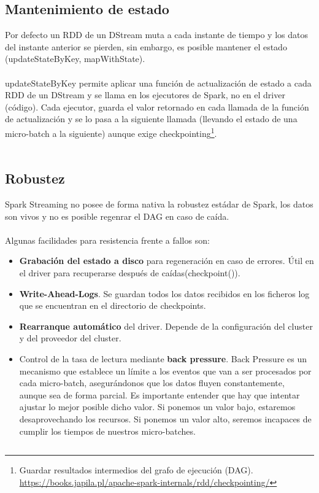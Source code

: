 \subsection{Mantenimiento de estado}
Por defecto un RDD de un DStream muta a cada instante de tiempo y los datos del instante anterior se pierden, sin embargo, es posible mantener el estado (updateStateByKey, mapWithState).\\\\
updateStateByKey permite aplicar una función de actualización de estado a cada RDD de un DStream y se llama en los ejecutores de Spark, no en el driver (código). Cada ejecutor, guarda el valor retornado en cada llamada de la función de actualización y se lo pasa a la siguiente llamada (llevando el estado de una micro-batch a la siguiente) aunque exige checkpointing\footnote{Guardar resultados intermedios del grafo de ejecución (DAG). \url{https://books.japila.pl/apache-spark-internals/rdd/checkpointing/} }.\\\\
\subsection{Robustez}
Spark Streaming no posee de forma nativa la robustez estádar de Spark, los datos son vivos y no es posible regenrar el DAG en caso de caída.\\\\
Algunas facilidades para resistencia frente a fallos son:
\begin{itemize}
	\item \textbf{Grabación del estado a disco} para regeneración en caso de errores. Útil en el driver para recuperarse después de caídas(checkpoint()).
	\item \textbf{Write-Ahead-Logs}. Se guardan todos los datos recibidos en los ficheros log que se encuentran en el directorio de checkpoints.
	\item \textbf{Rearranque automático} del driver. Depende de la configuración del cluster y del proveedor del cluster.
	\item Control de la tasa de lectura mediante \textbf{back pressure}. Back Pressure es un mecanismo que establece un límite a los eventos que van a ser procesados por cada micro-batch, asegurándonos que los datos fluyen constantemente, aunque sea de forma parcial. Es importante entender que hay que intentar ajustar lo mejor posible dicho valor. Si ponemos un valor bajo, estaremos desaprovechando los recursos. Si ponemos un valor alto, seremos incapaces de cumplir los tiempos de nuestros micro-batches.
\end{itemize}
\subsection{}

